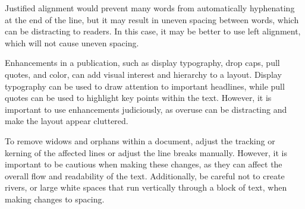 \documentclass{report}
\begin{document}
    \bigbreak \noindent \bigbreak \noindent 
    \bigbreak \noindent 
    \bigbreak \noindent 
    Justified alignment would prevent many words from automatically hyphenating at the end of the line, but it may result in uneven spacing between words, which can be distracting to readers. In this case, it may be better to use left alignment, which will not cause uneven spacing.
    
    \bigbreak \noindent \bigbreak \noindent 
    \bigbreak \noindent 
    \bigbreak \noindent 
    Enhancements in a publication, such as display typography, drop caps, pull quotes, and color, can add visual interest and hierarchy to a layout. Display typography can be used to draw attention to important headlines, while pull quotes can be used to highlight key points within the text. However, it is important to use enhancements judiciously, as overuse can be distracting and make the layout appear cluttered.
    
    \bigbreak \noindent \bigbreak \noindent 
    \bigbreak \noindent 
    \bigbreak \noindent 
    To remove widows and orphans within a document, adjust the tracking or kerning of the affected lines or adjust the line breaks manually. However, it is important to be cautious when making these changes, as they can affect the overall flow and readability of the text. Additionally, be careful not to create rivers, or large white spaces that run vertically through a block of text, when making changes to spacing.


    
    
\end{document}

